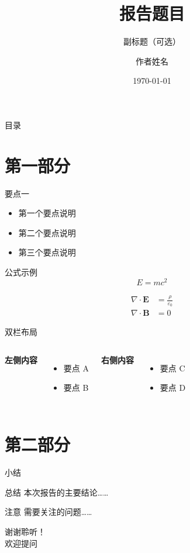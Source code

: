 \documentclass[UTF8,aspectratio=169,10pt]{ctexbeamer}
\title{报告题目}
\subtitle{副标题（可选）}
\author{作者姓名}
\institute{单位名称}
\date{\today}
\begin{document}
\begin{frame}
  \titlepage
\end{frame}

\begin{frame}{目录}
  \tableofcontents
\end{frame}

\section{第一部分}

\begin{frame}{要点一}
  \begin{itemize}
    \item 第一个要点说明
    \item 第二个要点说明
    \item 第三个要点说明
  \end{itemize}
\end{frame}

\begin{frame}{公式示例}
  \begin{equation}
    E = mc^2
  \end{equation}

  \begin{align}
    \nabla \cdot \mathbf{E} &= \frac{\rho}{\varepsilon_0} \\
    \nabla \cdot \mathbf{B} &= 0
  \end{align}
\end{frame}

\begin{frame}{双栏布局}
  \begin{columns}
      \textbf{左侧内容}
      \begin{itemize}
        \item 要点 A
        \item 要点 B
      \end{itemize}

      \textbf{右侧内容}
      \begin{itemize}
        \item 要点 C
        \item 要点 D
      \end{itemize}
  \end{columns}
\end{frame}

\section{第二部分}

\begin{frame}{小结}
  \begin{block}{总结}
    本次报告的主要结论……
  \end{block}

  \begin{alertblock}{注意}
    需要关注的问题……
  \end{alertblock}
\end{frame}

\begin{frame}
  \centering
  {\Huge 谢谢聆听！} \\[1em]
  {\large 欢迎提问}
\end{frame}
\end{document}
